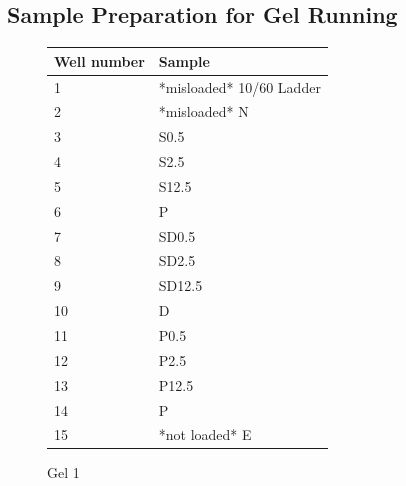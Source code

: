 \documentclass{ssiBio}
\begin{document}
\subsection{Sample Preparation for Gel Running}
\begin{figure}[ht] %
\begin{center}
\begin{tabular}{|l|l|}
\hline
Well number    & Sample \\ \hline
1                                  & *misloaded* 10/60 Ladder \\ \hline
2                                  & *misloaded* N \\ \hline
3                                  & S0.5 \\ \hline
4                                  & S2.5 \\ \hline
5                                  & S12.5 \\ \hline
6                                  & P \\ \hline
7                                  & SD0.5 \\ \hline
8								   & SD2.5 \\ \hline
9                                  & SD12.5 \\ \hline
10                                 & D \\ \hline
11								   & P0.5 \\ \hline
12                                 & P2.5 \\ \hline
13								   & P12.5 \\ \hline
14                                 & P  \\ \hline
15                                 & *not loaded* E  \\ \hline

\end{tabular}
\label{tab:Gel 1 Layout} %
\caption{Gel 1} %
\end{center}
\end{figure}
\end{document}
